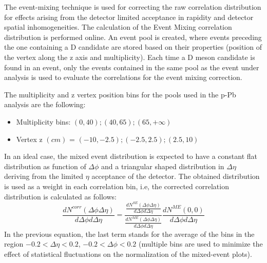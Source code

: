 \label{MEsection}
The event-mixing technique is used for correcting the raw correlation distribution for effects arising
from the detector limited acceptance in rapidity and detector spatial inhomogeneities. The calculation of the Event
Mixing correlation distribution is performed online.%
An event pool is created, where events preceding the one containing a D candidate are stored based on their properties (position of the vertex along the z axis and multiplicity).
Each time a D meson candidate is found in an event, only the events contained in the same pool as the event under analysis is used to evaluate the correlations for the event mixing correction.%

The multiplicity and z vertex position bins for the pools used in the p-Pb analysis are the following:
\begin{itemize}
\item Multiplicity bins: $\left(0,40\right);\left(40,65\right);\left(65,+\infty\right)$
\item Vertex z $(cm)$ = $\left(-10,-2.5\right);\left(-2.5,2.5\right);\left(2.5,10\right)$
\end{itemize}


In an ideal case, the mixed event distribution is expected to have a constant flat distribution as function of $\Delta\phi$ and a triangular shaped distribution in $\Delta\eta$
deriving from the limited $\eta$ acceptance of the detector. The obtained distribution is used as a weight in each correlation bin, i.e, the corrected correlation distribution is calculated as follows:
\begin{equation}
\label{eq:mixing}
\frac{dN^{corr}\left(\Delta\phi \Delta\eta\right)}{d\Delta\phi d\Delta\eta} = \frac{\frac{dN^{SE}\left(\Delta\phi \Delta\eta\right)}{d\Delta\phi d\Delta\eta} }{\frac{dN^{ME}\left(\Delta\phi \Delta\eta\right)}{d\Delta\phi d\Delta\eta} }\frac{dN^{ME}\left(0,  0\right)}{d\Delta\phi d\Delta\eta}
\end{equation}
In the previous equation, the last term stands for the average of the bins in the region $-0.2 < \Delta\eta < 0.2$, $-0.2 < \Delta\phi < 0.2$ (multiple bins are used to minimize the effect of statistical fluctuations on the normalization of the mixed-event plots).

